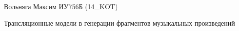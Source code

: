 \documentclass{bmstu}
\begin{document}
Вольняга Максим ИУ756Б (14\_KOT)

Трансляционные модели в генерации фрагментов музыкальных произведений 





\makebibliography
\end{document}
